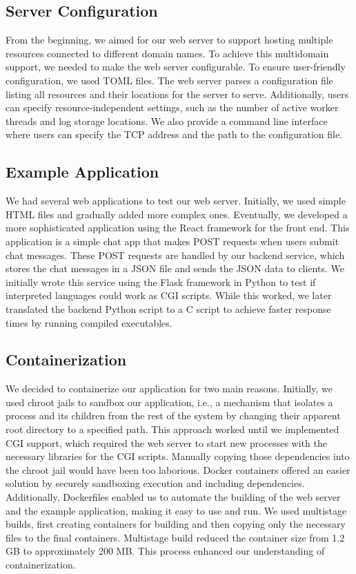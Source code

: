 \subsection*{Server Configuration}
From the beginning, we aimed for our web server to support hosting multiple resources connected to different domain names. To achieve this multidomain support, we needed to make the web server configurable. To ensure user-friendly configuration, we used TOML files. The web server parses a configuration file listing all resources and their locations for the server to serve. Additionally, users can specify resource-independent settings, such as the number of active worker threads and log storage locations. We also provide a command line interface where users can specify the TCP address and the path to the configuration file.


\subsection*{Example Application}

We had several web applications to test our web server. Initially, we used simple HTML files and gradually added more complex ones. Eventually, we developed a more sophisticated application using the React framework for the front end. This application is a simple chat app that makes POST requests when users submit chat messages. These POST requests are handled by our backend service, which stores the chat messages in a JSON file and sends the JSON data to clients. We initially wrote this service using the Flask framework in Python to test if interpreted languages could work as CGI scripts. While this worked, we later translated the backend Python script to a C script to achieve faster response times by running compiled executables.

\subsection*{Containerization}

We decided to containerize our application for two main reasons. Initially, we used chroot jails to sandbox our application, i.e., a mechanism that isolates a process and its children from the rest of the system by changing their apparent root directory to a specified path. This approach worked until we implemented CGI support, which required the web server to start new processes with the necessary libraries for the CGI scripts. Manually copying those dependencies into the chroot jail would have been too laborious. Docker containers offered an easier solution by securely sandboxing execution and including dependencies. Additionally, Dockerfiles enabled us to automate the building of the web server and the example application, making it easy to use and run. We used multistage builds, first creating containers for building and then copying only the necessary files to the final containers. Multistage build reduced the container size from 1.2 GB to approximately 200 MB. This process enhanced our understanding of containerization.
